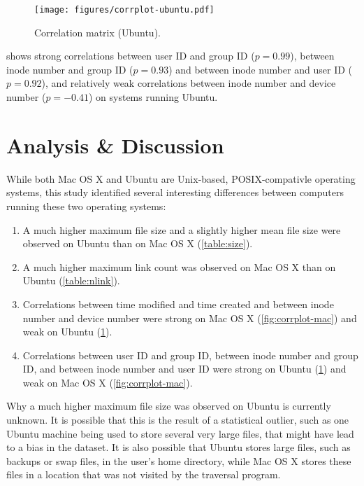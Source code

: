 \documentclass[12pt,letterpaper]{article}
\begin{document}
		\begin{figure}[H]
			\centerline{\texttt{[image: figures/corrplot-ubuntu.pdf]}}
			\caption{Correlation matrix (Ubuntu).}
			\label{fig:corrplot-ubuntu}
		\end{figure}

		 shows strong correlations between user ID and group ID ($p = 0.99$), between inode number and group ID ($p = 0.93$) and between inode number and user ID ($p = 0.92$), and relatively weak correlations between inode number and device number ($p = -0.41$) on systems running Ubuntu.

		\pagebreak
	\section{Analysis \& Discussion}

		While both Mac OS X and Ubuntu are Unix-based, POSIX-compativle operating systems, this study identified several interesting differences between computers running these two operating systems:
		\begin{enumerate}
			\item{A much higher maximum file size and a slightly higher mean file size were observed on Ubuntu than on Mac OS X (\cref{table:size}).}
			\item{A much higher maximum link count was observed on Mac OS X than on Ubuntu (\cref{table:nlink}).}
			\item{Correlations between time modified and time created and between inode number and device number were strong on Mac OS X (\cref{fig:corrplot-mac}) and weak on Ubuntu (\cref{fig:corrplot-ubuntu}).}
			\item{Correlations between user ID and group ID, between inode number and group ID, and between inode number and user ID were strong on Ubuntu (\cref{fig:corrplot-ubuntu}) and weak on Mac OS X (\cref{fig:corrplot-mac}).}
		\end{enumerate}

		Why a much higher maximum file size was observed on Ubuntu is currently unknown. It is possible that this is the result of a statistical outlier, such as one Ubuntu machine being used to store several very large files, that might have lead to a bias in the dataset. It is also possible that Ubuntu stores large files, such as backups or swap files, in the user's home directory, while Mac OS X stores these files in a location that was not visited by the traversal program.
\end{document}
